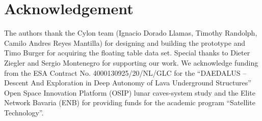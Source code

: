 \section*{Acknowledgement}

The authors thank the Cylon team (Ignacio Dorado Llamas, Timothy Randolph, Camilo Andres Reyes Mantilla) for designing and building the prototype and Timo Burger for acquiring the floating table data set.
Special thanks to Dieter Ziegler and Sergio Montenegro for supporting our work.
We acknowledge funding from the ESA Contract No. 4000130925/20/NL/GLC for the ``DAEDALUS -- Descent And Exploration in Deep Autonomy of Lava Underground Structures'' Open Space Innovation Platform (OSIP) lunar caves-system study and the Elite Network Bavaria (ENB) for providing funds for the academic program ``Satellite Technology''.
